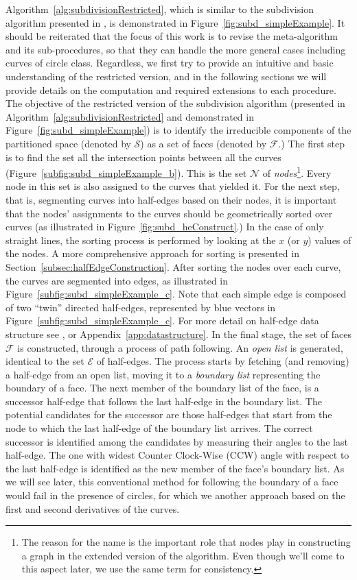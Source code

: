 Algorithm~\ref{alg:subdivisionRestricted}, which is similar to the subdivision algorithm presented in \cite{de2000computational}, is demonstrated in Figure~\ref{fig:subd_simpleExample}.
It should be reiterated that the focus of this work is to revise the meta-algorithm and its sub-procedures, so that they can handle the more general cases including curves of circle class.
Regardless, we first try to provide an intuitive and basic understanding of the restricted version, and in the following sections we will provide details on the computation and required extensions to each procedure.
The objective of the restricted version of the subdivision algorithm (presented in Algorithm~\ref{alg:subdivisionRestricted} and demonstrated in Figure~\ref{fig:subd_simpleExample}) is to identify the irreducible components of the partitioned space (denoted by $\mathcal{S}$) as a set of faces (denoted by $\mathcal{F}$.)
The first step is to find the set all the intersection points between all the curves (Figure~\ref{subfig:subd_simpleExample_b}).
This is the set $\mathcal{N}$ of \emph{nodes}\footnote{The reason for the name is the important role that nodes play in constructing a graph in the extended version of the algorithm. Even though we'll come to this aspect later, we use the same term for consistency.}.
Every node in this set is also assigned to the curves that yielded it.
For the next step, that is, segmenting curves into half-edges based on their nodes, it is important that the nodes' assignments to the curves should be geometrically sorted over curves (as illustrated in Figure~\ref{fig:subd_heConstruct}.)
In the case of only straight lines, the sorting process is performed by looking at the $x$ (or $y$) values of the nodes.
A more comprehensive approach for sorting is presented in Section~\ref{subsec:halfEdgeConstruction}.
After sorting the nodes over each curve, the curves are segmented into edges, as illustrated in Figure~\ref{subfig:subd_simpleExample_c}.
Note that each simple edge is composed of two ``twin'' directed half-edges, represented by blue vectors in Figure~\ref{subfig:subd_simpleExample_c}.
For more detail on half-edge data structure see \cite{de2000computational}, or Appendix~\ref{app:datastructure}.
In the final stage, the set of faces $\mathcal{F}$ is constructed, through a process of path following.
An \emph{open list} is generated, identical to the set $\mathcal{E}$ of half-edges.
The process starts by fetching (and removing) a half-edge from an open list, moving it to a \emph{boundary list} representing the boundary of a face.
The next member of the boundary list of the face, is a successor half-edge that follows the last half-edge in the boundary list.
The potential candidates for the successor are those half-edges that start from the node to which the last half-edge of the boundary list arrives.
The correct successor is identified among the candidates by measuring their angles to the last half-edge.
The one with widest Counter Clock-Wise (CCW) angle with respect to the last half-edge is identified as the new member of the face's boundary list.
As we will see later, this conventional method for following the boundary of a face would fail in the presence of circles, for which we another approach based on the first and second derivatives of the curves.

